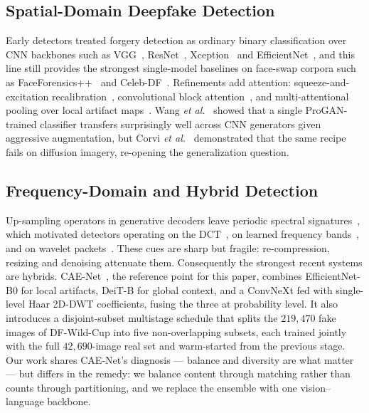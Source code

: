 \documentclass[10pt,journal]{IEEEtran}
\begin{document}
\subsection{Spatial-Domain Deepfake Detection}
Early detectors treated forgery detection as ordinary binary classification
over CNN backbones such as VGG~\cite{simonyan2015vgg},
ResNet~\cite{he2016resnet}, Xception~\cite{chollet2017xception} and
EfficientNet~\cite{tan2019efficientnet}, and this line still provides the
strongest single-model baselines on face-swap corpora such as
FaceForensics++~\cite{rossler2019faceforensics} and
Celeb-DF~\cite{li2020celebdf}. Refinements add attention: squeeze-and-excitation
recalibration~\cite{hu2018senet}, convolutional block attention~\cite{woo2018cbam},
and multi-attentional pooling over local artifact
maps~\cite{zhao2021multiattentional}. Wang \emph{et al.}~\cite{wang2020cnngenerated}
showed that a single ProGAN-trained classifier transfers surprisingly well
across CNN generators given aggressive augmentation, but Corvi \emph{et
al.}~\cite{corvi2023diffusion} demonstrated that the same recipe fails on
diffusion imagery, re-opening the generalization question.

\subsection{Frequency-Domain and Hybrid Detection}
Up-sampling operators in generative decoders leave periodic spectral
signatures~\cite{durall2020upconvolution}, which motivated detectors operating
on the DCT~\cite{frank2020frequency,ricker2024dct}, on learned frequency
bands~\cite{qian2020f3net}, and on wavelet
packets~\cite{wolter2022waveletpacket}. These cues are sharp but fragile:
re-compression, resizing and denoising attenuate them. Consequently the strongest
recent systems are hybrids. CAE-Net~\cite{bhattacharjee2026caenet}, the reference
point for this paper, combines EfficientNet-B0 for local artifacts, DeiT-B for
global context, and a ConvNeXt fed with single-level Haar 2D-DWT coefficients,
fusing the three at probability level. It also introduces a disjoint-subset
multistage schedule that splits the $219{,}470$ fake images of DF-Wild-Cup into
five non-overlapping subsets, each trained jointly with the full $42{,}690$-image
real set and warm-started from the previous stage. Our work shares CAE-Net's
diagnosis --- balance and diversity are what matter --- but differs in the
remedy: we balance content through matching rather than counts through
partitioning, and we replace the ensemble with one vision--language backbone.
\end{document}
